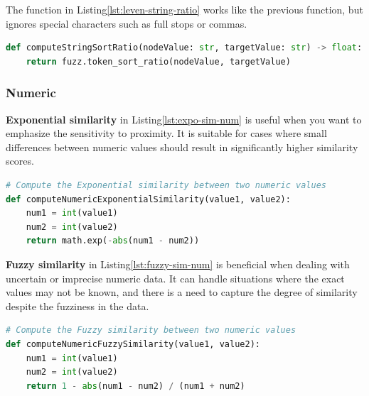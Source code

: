     
    The function in Listing\ref{lst:leven-string-ratio} works like the previous function, but ignores special characters such as full stops or commas.\\
    
\begin{lstlisting}[language=Python, caption=Levenstein distance between two strings without considering special characters, label={lst:leven-string-ratio}]
def computeStringSortRatio(nodeValue: str, targetValue: str) -> float:
    return fuzz.token_sort_ratio(nodeValue, targetValue)
\end{lstlisting}





    \subsubsection{Numeric}
    
    \textbf{Exponential similarity} in Listing\ref{lst:expo-sim-num} is useful when you want to emphasize the sensitivity to proximity. It is suitable for cases where small differences between numeric values should result in significantly higher similarity scores.\\
    
\begin{lstlisting}[language=Python, caption=Function to compute the similarity value between two attributes, label={lst:expo-sim-num}]
# Compute the Exponential similarity between two numeric values
def computeNumericExponentialSimilarity(value1, value2):
    num1 = int(value1)
    num2 = int(value2)
    return math.exp(-abs(num1 - num2))
\end{lstlisting}
    
    
    \textbf{Fuzzy similarity} in Listing\ref{lst:fuzzy-sim-num} is beneficial when dealing with uncertain or imprecise numeric data. It can handle situations where the exact values may not be known, and there is a need to capture the degree of similarity despite the fuzziness in the data.\\
\begin{lstlisting}[language=Python, caption=Function to compute the similarity value between two attributes, label={lst:fuzzy-sim-num}]
# Compute the Fuzzy similarity between two numeric values
def computeNumericFuzzySimilarity(value1, value2):
    num1 = int(value1)
    num2 = int(value2)
    return 1 - abs(num1 - num2) / (num1 + num2)
\end{lstlisting}

